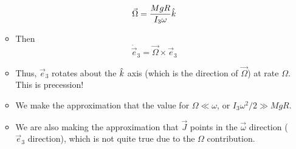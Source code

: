 \documentclass[../notes.tex]{subfiles}
\begin{document}
\begin{itemize}
\begin{itemize}
\begin{equation*}
            \vec{\Omega} = \frac{MgR}{I_3\omega}\hat{k}
        \end{equation*}
        \item Then
        \begin{equation*}
            \dot{\vec{e}}_3 = \vec{\Omega}\times\vec{e}_3
        \end{equation*}
        \item Thus, $\vec{e}_3$ rotates about the $\hat{k}$ axis (which is the direction of $\vec{\Omega}$) at rate $\Omega$. This is precession!
        \item We make the approximation that the value for $\Omega\ll\omega$, or $I_3\omega^2/2\gg MgR$.
        \item We are also making the approximation that $\vec{J}$ points in the $\vec{\omega}$ direction ($\vec{e}_3$ direction), which is not quite true due to the $\Omega$ contribution.
    \end{itemize}
\end{itemize}
\end{document}
